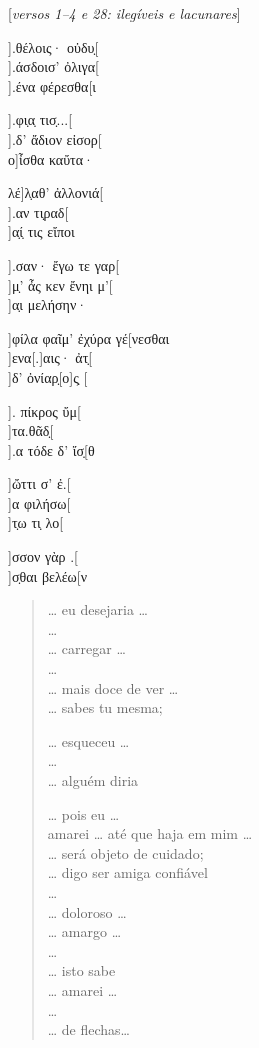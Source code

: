 \begin{gkverse}
\textnormal{[\textit{versos 1--4 e 28: ilegíveis e lacunares}]}

].θέλοις· οὐδυ̣[\\
].άσδοισ’ ὀλιγα[\\
].ένα φέρεσθα[ι

  ].φι̣α̣ τισ̣...[\\
  ].δ’ ἄδιον εἰσορ[\\
ο]ἶσθα καὔτα·

λέ]λ̣αθ’ ἀλλονιά[\\
     ].αν τι̣ραδ[\\
     ]α̣ί̣ τις εἴποι

].σαν· ἔγω τε γαρ[\\
]μ̣’ ἆς κεν ἔνηι μ’[\\
  ]α̣ι μελήσην·

]φίλα φαῖμ’ ἐχύρα γέ[νεσθαι\\
   ]ενα[.]αις· ἀτ̣[\\
          ]δ’ ὀνίαρ̣[ο]ς̣ [

        ]. πίκρος ὔμ[\\
        ]τα.θᾶδ̣[\\
        ].α τόδε δ’ ἴσ̣[θ

       ]ὤττι σ’ ἐ.[\\
]α φιλήσω[\\
]τ̣ω τι̣ λο[

]σσον γὰρ .[\\
          ]σ̣θαι βελέω[ν
\end{gkverse}

\pagebreak
\begin{verse}
\ldots{} eu desejaria \ldots{}\\
\ldots{}\\
\ldots{} carregar \ldots{}\\
\ldots{}\\
\ldots{} mais doce de ver \ldots{}\\
\ldots{} sabes tu mesma;

\ldots{} esqueceu \ldots{}\\ 
\ldots{}\\
\ldots{} alguém diria

\ldots{} pois eu \ldots{}\\
amarei \ldots{} até que haja em mim \ldots{}\\
\ldots{} será objeto de cuidado;\\
\ldots{} digo ser amiga confiável \\
\ldots{}\\
\ldots{} doloroso \ldots{}\\
\ldots{} amargo \ldots{}\\
\ldots{}\\
\ldots{} isto sabe\\
\ldots{} amarei \ldots{}\\
\ldots{}\\
\ldots{} de flechas\ldots{}
\end{verse}

